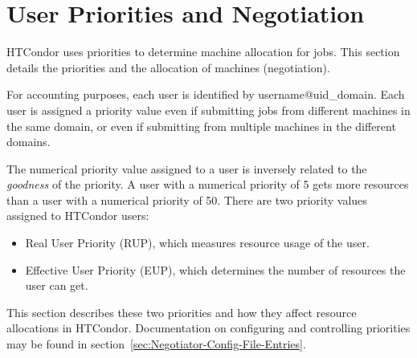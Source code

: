 \section{\label{sec:UserPrio}User Priorities and Negotiation}



HTCondor uses priorities to determine machine allocation for jobs.
This section details the priorities and the allocation of
machines (negotiation).

For accounting purposes, each user is identified by username@uid\_domain.
Each user is assigned a priority value even if submitting jobs from
different machines in the same domain, or even if submitting from multiple
machines in the different domains.

The numerical priority value assigned to a user is inversely related to the 
\emph{goodness} of the priority.
A user with a numerical priority of 5 gets 
more resources than a user with a numerical priority of 50.
There are two 
priority values assigned to HTCondor users:
\begin{itemize}
	\item Real User Priority (RUP), which measures resource usage of the 
		user.
	\item Effective User Priority (EUP), which determines the number of
		resources the user can get.
\end{itemize}
This section describes these two priorities and how they affect resource
allocations in HTCondor.
Documentation on configuring and controlling 
priorities may be found in section~\ref{sec:Negotiator-Config-File-Entries}.

